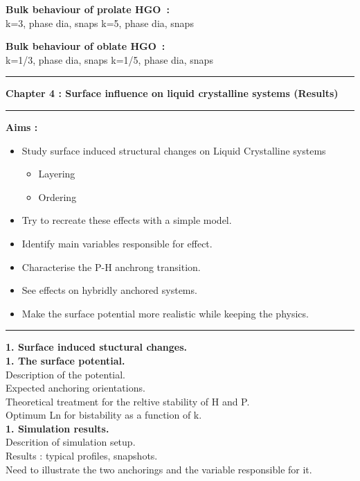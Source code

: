 \documentclass[a4paper]{article}
\newcommand{\mkChapBig}[1]
	{
	\newpage
	\hrule
	\begin{center}
	\LARGE\textbf{#1}
	\end{center}
	\hrule
	\vspace{5mm}
	}
\newcommand{\mkSectionBig}[1]
	{
	\Large\textbf{#1}\\
	}
\newcommand{\mkSubSectionBig}[1]
	{
	\hspace*{10mm}\large\textbf{#1}\\
	}
\begin{document}
\mkSectionBig{Bulk behaviour of prolate HGO~:}
k=3, phase dia, snaps
k=5, phase dia, snaps

\mkSectionBig{Bulk behaviour of oblate HGO~:}
k=1/3, phase dia, snaps
k=1/5, phase dia, snaps

\mkChapBig{Chapter 4 : Surface influence on liquid crystalline systems (Results)}

\mkSectionBig{Aims :}

\large
\begin{itemize}
	\item Study surface induced structural changes on Liquid Crystalline systems
		\begin{itemize}
		\item Layering
		\item Ordering
		\end{itemize}
	\item Try to recreate these effects with a simple model.
	\item Identify main variables responsible for effect.
	\item Characterise the P-H anchrong transition.
	\item See effects on hybridly anchored systems.
	\item Make the surface potential more realistic while keeping the physics.
\end{itemize}
\hrule
\vspace{5mm}

\mkSectionBig{1. Surface induced stuctural changes.}

\mkSubSectionBig{1. The surface potential.}
Description of the potential.\\
Expected anchoring orientations.\\
Theoretical treatment for the reltive stability of H and P.\\
Optimum Ln for bistability as a function of k.\\

\mkSubSectionBig{1. Simulation results.}
Descrition of simulation setup.\\
Results : typical profiles, snapshots.\\
Need to illustrate the two anchorings and the variable responsible for it.\\
\end{document}
